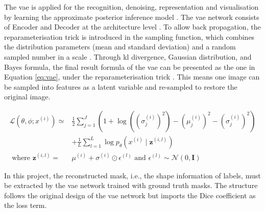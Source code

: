 \documentclass[11pt,times,oneside,openright]{eeereport}
\begin{document}
The \acrfull{vae} is applied for the recognition, denoising, representation and visualisation by learning the approximate posterior inference model \cite{kingma2013auto}. The \acrshort{vae} network consists of Encoder and Decoder at the architecture level \cite{kingma2013auto}. To allow back propagation, the reparameterisation trick is introduced in the sampling function, which combines the distribution parameters (mean and standard deviation) and a random sampled number in a scale \cite{kingma2013auto}. Through \acrshort{kl} divergence, Gaussian distribution, and Bayes formula, the final result formula of the \acrshort{vae} can be presented as the one in Equation \ref{eq:vae}, under the reparameterisation trick \cite{kingma2013auto}. This means one image can be sampled into features as a latent variable and re-sampled to restore the original image.

\begin{equation} \label{eq:vae}
    \begin{aligned}
    \mathcal{L}\left(\theta, \phi ; x^{(i)}\right) \simeq & \frac{1}{2} \sum_{j=1}^{J}\left(1+\log \left(\left(\sigma_{j}^{(i)}\right)^{2}\right)-\left(\mu_{j}^{(i)}\right)^{2}-\left(\sigma_{j}^{(i)}\right)^{2}\right) \\
    & +\frac{1}{L} \sum_{l=1}^{L} \log p_{\theta}\left(x^{(i)} \mid \mathbf{z}^{(i, l)}\right) \\
    \text { where } \mathbf{z}^{(i, l)}= & \mu^{(i)}+\sigma^{(i)} \odot \epsilon^{(l)} \text { and } \epsilon^{(l)} \sim \mathcal{N}(0, \mathbf{I})
    \end{aligned}
\end{equation}

In this project, the reconstructed mask, i.e., the shape information of labels, must be extracted by the \acrshort{vae} network trained with ground truth masks. The structure follows the original design of the \acrshort{vae} network but imports the Dice coefficient as the loss term.
\end{document}
